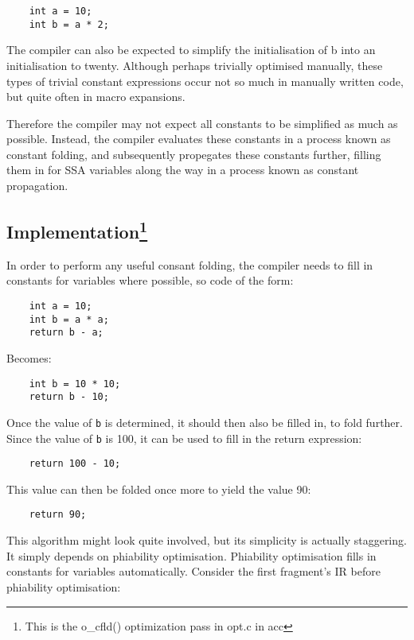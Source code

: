 \documentclass[12pt, a4paper]{article}
\begin{document}
\begin{lstlisting}
	int a = 10;
	int b = a * 2;
\end{lstlisting}

The compiler can also be expected to simplify the initialisation of b into an 
initialisation to twenty. Although perhaps trivially optimised manually, these
types of trivial constant expressions occur not so much in manually written code,
but quite often in macro expansions.

Therefore the compiler may not expect all constants to be simplified as much as
possible. Instead, the compiler evaluates these constants in a process known as 
constant folding, and subsequently propegates these constants further, filling 
them in for SSA variables along the way in a process known as constant 
propagation.

\subsection[Implementation] {Implementation\footnote{This is the o\_cfld() optimization pass in opt.c in acc} }
In order to perform any useful consant folding, the compiler needs to fill in 
constants for variables where possible, so code of the form:

\begin{lstlisting}
	int a = 10;
	int b = a * a;
	return b - a;
\end{lstlisting}

Becomes:

\begin{lstlisting}
	int b = 10 * 10;
	return b - 10;
\end{lstlisting}

Once the value of \verb+b+ is determined, it should then also be filled in, to fold 
further. Since the value of \verb+b+ is 100, it can be used to fill in the return 
expression:

\begin{lstlisting}
	return 100 - 10;
\end{lstlisting}

This value can then be folded once more to yield the value 90:

\begin{lstlisting}
	return 90;
\end{lstlisting}

This algorithm might look quite involved, but its simplicity is actually 
staggering. It simply depends on phiability optimisation. Phiability 
optimisation fills in constants for variables automatically. Consider the first 
fragment's IR before phiability optimisation:
\end{document}
